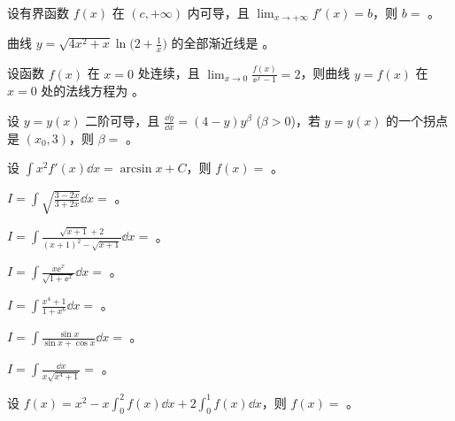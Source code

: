 \begin{ti}
	设有界函数 $f(x)$ 在 $(c,+\infty)$ 内可导，且 $\lim_{x \to +\infty} f'(x) = b$，则 $b = $ \hua。
\end{ti}

\begin{ti}
	曲线 $y = \sqrt{4x^2 + x} \ln \biggl( 2 + \frac 1x \biggr)$ 的全部渐近线是 \hua。
\end{ti}

\begin{ti}
	设函数 $f(x)$ 在 $x = 0$ 处连续，且 $\lim_{x \to 0} \frac{f(x)}{\ee^x - 1} = 2$，则曲线 $y = f(x)$ 在 $x = 0$ 处的法线方程为 \hua。
\end{ti}

\begin{ti}
	设 $y = y(x)$ 二阶可导，且 $\frac{\dd{y}}{\dd{x}} = (4 - y) y^\beta$ ($\beta > 0$)，若 $y = y(x)$ 的一个拐点是 $(x_0,3)$，则 $\beta = $ \hua。
\end{ti}

\begin{ti}
	设 $\int x^2 f'(x) \dd{x} = \arcsin x + C$，则 $f(x) = $ \hua。
\end{ti}

\begin{ti}
	$I = \int \sqrt{\frac{3-2x}{3+2x}} \dd{x} = $ \hua。
\end{ti}

\begin{ti}
	$I = \int \frac{\sqrt{x+1} + 2}{(x+1)^2 - \sqrt{x+1}} \dd{x} = $ \hua。
\end{ti}

\begin{ti}
	$I = \int \frac{x \ee^x}{\sqrt{1 + \ee^x}} \dd{x} = $ \hua。
\end{ti}

\begin{ti}
	$I = \int \frac{x^4 + 1}{1 + x^6} \dd{x} = $ \hua。
\end{ti}

\begin{ti}
	$I = \int \frac{\sin x}{\sin x + \cos x} \dd{x} = $ \hua。
\end{ti}

\begin{ti}
	$I = \int \frac{\dd{x}}{x \sqrt{x^4 + 1}} = $ \hua。
\end{ti}

\begin{ti}
	设 $f(x) = x^2 - x \int_0^2 f(x) \dd{x} + 2 \int_0^1 f(x) \dd{x}$，则 $f(x) = $ \hua。
\end{ti}

